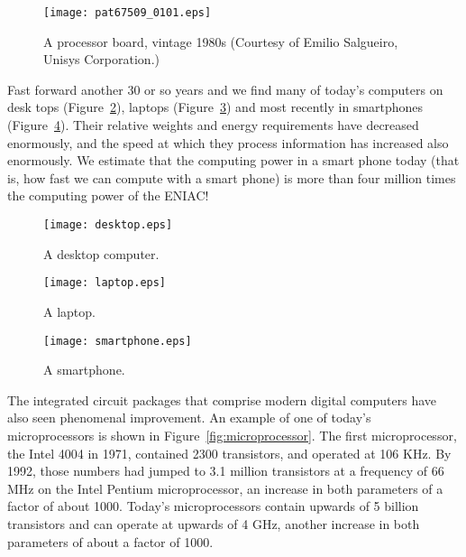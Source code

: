 \documentclass{patt}
\begin{document}
\begin{figure}
\centerline{\texttt{[image: pat67509\_0101.eps]}}
\caption{A processor board, vintage 1980s (Courtesy of Emilio Salgueiro, Unisys Corporation.)}
\label{fig:cpu_board}
\end{figure}

\FloatBarrier

Fast forward another 30 or so years and we find many of today's computers 
on desk tops (Figure~\ref{fig:desktop}), laptops (Figure~\ref{fig:laptop}) 
and most recently in smartphones (Figure~\ref{fig:smartphone}).  Their 
relative weights and energy requirements have decreased enormously, and the 
speed at which they process information has increased also enormously.  
We estimate that the computing power in a smart phone today (that is, how fast
we can compute with a smart phone) is more than four million times 
the computing power of the ENIAC!

\begin{figure}
\vspace{2pt}
\centerline{\texttt{[image: desktop.eps]}}
\caption{A desktop computer.}
\label{fig:desktop}
\end{figure}


\begin{figure}
\centerline{\texttt{[image: laptop.eps]}}
\caption{A laptop.}
\label{fig:laptop}
\vspace{12pt}
\end{figure}


\begin{figure}
\centerline{\texttt{[image: smartphone.eps]}}
\caption{A smartphone.}
\label{fig:smartphone}
\vspace{12pt}
\end{figure}


\FloatBarrier
The integrated circuit packages that comprise modern digital computers have
also seen phenomenal improvement.  An example of one of today's microprocessors
is shown in Figure~\ref{fig:microprocessor}.  The first microprocessor, 
the Intel 4004 in 1971,
contained 2300 transistors, and operated at 106 KHz.  By 1992, those
numbers had jumped to 3.1 million transistors at a frequency of 66 MHz on the
Intel Pentium microprocessor, an increase in both parameters of a factor of
about 1000.  
Today's microprocessors contain upwards of 5 billion transistors and can 
operate at upwards of 4 GHz, another increase in both parameters of about a 
factor of 1000.
\end{document}
